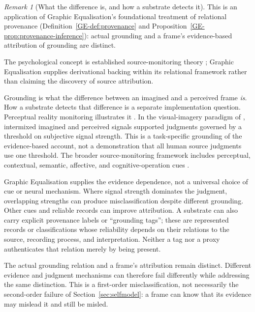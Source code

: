 \documentclass[11pt,a4paper]{article}
\theoremstyle{remark}\newtheorem{remark}[definition]{Remark}
\begin{document}
\begin{remark}[What the difference is, and how a substrate detects it]\label{rem:detection}
This is an application of Graphic Equalisation's foundational treatment of
relational provenance (Definition~\ref{GE-def:provenance} and
Proposition~\ref{GE-prop:provenance-inference}): actual grounding and a frame's
evidence-based attribution of grounding are distinct.

The psychological concept is established source-monitoring theory
\citep{johnson1993}; Graphic Equalisation supplies derivational backing within
its relational framework rather than claiming the discovery of source
attribution.

Grounding is what the difference between an imagined and a perceived frame
\emph{is}. How a substrate detects that difference is a separate implementation
question. Perceptual reality monitoring illustrates it \citep{dijkstra2022}.
In the visual-imagery paradigm of \citet{dijkstra2023}, intermixed imagined
and perceived signals supported judgments governed by a threshold on
subjective signal strength. This is a task-specific grounding of the
evidence-based account, not a demonstration that all human source judgments
use one threshold. The broader source-monitoring framework includes
perceptual, contextual, semantic, affective, and cognitive-operation cues
\citep{johnson1993}.

Graphic Equalisation supplies the evidence dependence, not a universal
choice of cue or neural mechanism. Where signal strength dominates the
judgment, overlapping strengths can produce misclassification despite
different grounding. Other cues and reliable records can improve attribution.
A substrate can also carry explicit provenance labels or ``grounding tags'';
these are represented records or classifications whose reliability depends
on their relations to the source, recording process, and interpretation.
Neither a tag nor a proxy authenticates that relation merely by being present.

The actual grounding relation and a frame's attribution remain distinct.
Different evidence and judgment mechanisms can therefore fail differently
while addressing the same distinction. This is a first-order misclassification,
not necessarily the second-order failure of Section~\ref{sec:selfmodel}: a
frame can know that its evidence may mislead it and still be misled.
\end{remark}
\end{document}
